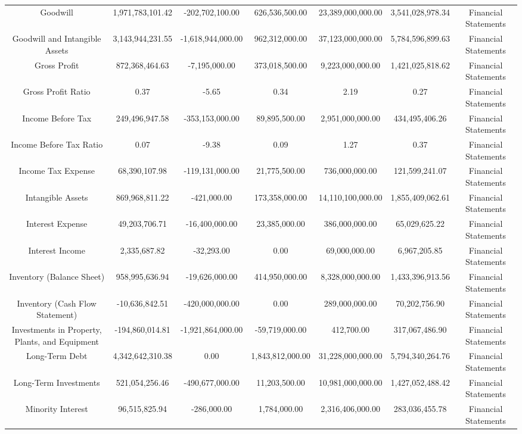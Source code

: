 \begin{longtable}{ccccccc}
Goodwill & 1,971,783,101.42 & -202,702,100.00 & 626,536,500.00 & 23,389,000,000.00 & 3,541,028,978.34 & Financial Statements \\
Goodwill and Intangible Assets & 3,143,944,231.55 & -1,618,944,000.00 & 962,312,000.00 & 37,123,000,000.00 & 5,784,596,899.63 & Financial Statements \\
Gross Profit & 872,368,464.63 & -7,195,000.00 & 373,018,500.00 & 9,223,000,000.00 & 1,421,025,818.62 & Financial Statements \\
Gross Profit Ratio & 0.37 & -5.65 & 0.34 & 2.19 & 0.27 & Financial Statements \\
Income Before Tax & 249,496,947.58 & -353,153,000.00 & 89,895,500.00 & 2,951,000,000.00 & 434,495,406.26 & Financial Statements \\
Income Before Tax Ratio & 0.07 & -9.38 & 0.09 & 1.27 & 0.37 & Financial Statements \\
Income Tax Expense & 68,390,107.98 & -119,131,000.00 & 21,775,500.00 & 736,000,000.00 & 121,599,241.07 & Financial Statements \\
Intangible Assets & 869,968,811.22 & -421,000.00 & 173,358,000.00 & 14,110,100,000.00 & 1,855,409,062.61 & Financial Statements \\
Interest Expense & 49,203,706.71 & -16,400,000.00 & 23,385,000.00 & 386,000,000.00 & 65,029,625.22 & Financial Statements \\
Interest Income & 2,335,687.82 & -32,293.00 & 0.00 & 69,000,000.00 & 6,967,205.85 & Financial Statements \\
Inventory (Balance Sheet) & 958,995,636.94 & -19,626,000.00 & 414,950,000.00 & 8,328,000,000.00 & 1,433,396,913.56 & Financial Statements \\
Inventory (Cash Flow Statement) & -10,636,842.51 & -420,000,000.00 & 0.00 & 289,000,000.00 & 70,202,756.90 & Financial Statements \\
Investments in Property, Plants, and Equipment & -194,860,014.81 & -1,921,864,000.00 & -59,719,000.00 & 412,700.00 & 317,067,486.90 & Financial Statements \\
Long-Term Debt & 4,342,642,310.38 & 0.00 & 1,843,812,000.00 & 31,228,000,000.00 & 5,794,340,264.76 & Financial Statements \\
Long-Term Investments & 521,054,256.46 & -490,677,000.00 & 11,203,500.00 & 10,981,000,000.00 & 1,427,052,488.42 & Financial Statements \\
Minority Interest & 96,515,825.94 & -286,000.00 & 1,784,000.00 & 2,316,406,000.00 & 283,036,455.78 & Financial Statements \\

\end{longtable}

